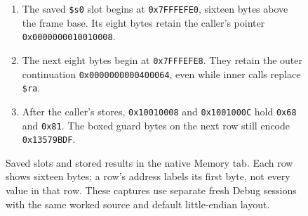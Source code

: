 \begin{figure}[htbp]
  \par\medskip
  \begin{minipage}{\linewidth}\small
    \begin{enumerate}
      \item The saved \texttt{\$s0} slot begins at \texttt{0x7FFFEFE0}, sixteen bytes above the frame base. Its eight bytes retain the caller's pointer \texttt{0x0000000010010008}.
      \item The next eight bytes begin at \texttt{0x7FFFEFE8}. They retain the outer continuation \texttt{0x0000000000400064}, even while inner calls replace \texttt{\$ra}.
      \item After the caller's stores, \texttt{0x10010008} and \texttt{0x1001000C} hold \texttt{0x68} and \texttt{0x81}. The boxed guard bytes on the next row still encode \texttt{0x13579BDF}.
    \end{enumerate}
  \end{minipage}
  \caption{Saved slots and stored results in the native Memory tab. Each row shows sixteen bytes; a row's address labels its first byte, not every value in that row. These captures use separate fresh Debug sessions with the same worked source and default little-endian layout.}
  \label{fig:revision-function-memory}
\end{figure}
